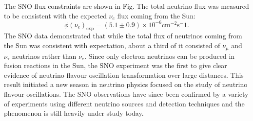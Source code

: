 The SNO flux constraints are shown in Fig. The total neutrino flux was measured to be consistent with the expected $\nu_e$ flux coming from the Sun:
\begin{equation}
    \phi(\nu_e)_\text{exp} = (5.1\pm0.9)\times10^{-6}\text{cm}^{-2}\text{s}^-1 .
\end{equation}
The SNO data demonstrated that while the total flux of neutrinos coming from the Sun was consistent with expectation, about a third of it consisted of $\nu_\mu$ and $\nu_\tau$ neutrinos rather than $\nu_e$. Since only electron neutrinos can be produced in fusion reactions in the Sun, the SNO experiment was the first to give clear evidence of neutrino flavour oscillation transformation over large distances. This result initiated a new season in neutrino physics focused on the study of neutrino flavour oscillations. The SNO observations have since been confirmed by a variety of experiments using different neutrino sources and detection techniques and the phenomenon is still heavily under study today. 




